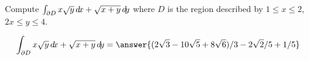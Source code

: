 \documentclass{ximera}
\author{David Guichard \and Neal Koblitz \and H. Jerome Keisler \and Albert Scheller \and Barry Balof \and Mike Wills \and Matthew Carr}
\begin{document}
\begin{exercise}




Compute $\int_{\partial D}x\sqrt{y}\mathop{}\!d\! x+\sqrt{x+y}\mathop{}\!d\! y$ where $D$ is the region described by $1\le x\le 2$, $2x\le y\le 4$. 
 

\begin{prompt}
\[
\int_{\partial D}x\sqrt{y}\d x+\sqrt{x+y} \d y=\answer{(2\sqrt{3}-10\sqrt{5}+8\sqrt{6})/3-2\sqrt{2}/5+1/5}
\]
\end{prompt}

\end{exercise}
\end{document}
